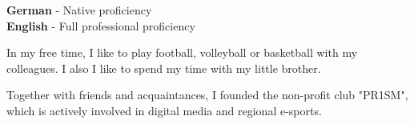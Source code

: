 \documentclass[9pt]{developercv} %
\begin{document}

\begin{minipage}[t]{0.3\textwidth}
	\vspace{-\baselineskip} %

	
	\textbf{German} - Native proficiency\\
	\textbf{English} - Full professional proficiency\\
\end{minipage}
\hfill
\begin{minipage}[t]{0.3\textwidth}
	\vspace{-\baselineskip} %
	
	
	In my free time, I like to play football, volleyball or basketball with my colleagues. I also I like to spend my time with my little brother.
\end{minipage}
\hfill
\begin{minipage}[t]{0.3\textwidth}
	\vspace{-\baselineskip} %
	
	
  Together with friends and acquaintances, I founded the non-profit club "PR1SM", which is actively involved in digital media and regional e-sports.
\end{minipage}

\end{document}
